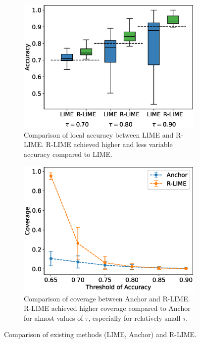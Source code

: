 \documentclass[runningheads]{llncs}
\begin{document}
\begin{figure}[t]
  \begin{subfigure}[t]{0.48\textwidth}
    \centering
    \includegraphics[scale=0.36,valign=t]{src/experiments/exp2/box_plot}
    \caption[Comparison of Local Accuracy between R-LIME and LIME]{%
      Comparison of local accuracy between LIME and R-LIME\@.
      R-LIME achieved higher and less variable accuracy compared to LIME\@.
    }\label{fig:box-plot}
  \end{subfigure}
  \hfill
  \begin{subfigure}[t]{0.48\textwidth}
    \centering
    \includegraphics[scale=0.35,valign=t]{src/experiments/exp2/comp_cov}
    \vspace{3pt}
    \caption[Comparison of Coverage between Anchor and R-LIME]{%
      Comparison of coverage between Anchor and R-LIME\@.
      R-LIME achieved higher coverage compared to Anchor
      for almost values of $\tau$, especially for relatively small $\tau$.
    }\label{fig:coverage}
  \end{subfigure}
  \caption{Comparison of existing methods (LIME, Anchor) and R-LIME.}
\end{figure}
\end{document}
